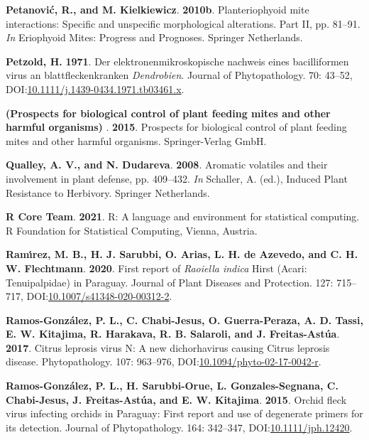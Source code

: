 \documentclass[12pt,final,CPage]{ufthesis}
\newlength{\cslhangindent}
\newenvironment{CSLReferences}[2] %
{%
	\setlength{\parindent}{0pt}
	\ifodd #1 \everypar{\setlength{\hangindent}{\cslhangindent}}\ignorespaces\fi
	\ifnum #2 > 0
	\setlength{\parskip}{#2\baselineskip}
	\fi
}%
{}
\begin{document}
{\begin{CSLReferences}{1}{0}
  \leavevmode{}%
  \textbf{Petanović, R., and M. Kielkiewicz}. \textbf{2010b}. Plant{\textendash}eriophyoid mite interactions: Specific and unspecific morphological alterations. Part {II}, pp. 81--91. \emph{In} Eriophyoid Mites: Progress and Prognoses. Springer Netherlands.

  \leavevmode{}%
  \textbf{Petzold, H.} \textbf{1971}. Der elektronenmikroskopische nachweis eines bacilliformen virus an blattfleckenkranken {\emph{Dendrobien}}. Journal of Phytopathology. 70: 43--52, DOI:\href{https://doi.org/10.1111/j.1439-0434.1971.tb03461.x}{10.1111/j.1439-0434.1971.tb03461.x}.

  \leavevmode{}%
  \textbf{(Prospects for biological control of plant feeding mites and other harmful organisms) }. \textbf{2015}. Prospects for biological control of plant feeding mites and other harmful organisms. Springer-Verlag GmbH.

  \leavevmode{}%
  \textbf{Qualley, A. V., and N. Dudareva}. \textbf{2008}. Aromatic volatiles and their involvement in plant defense, pp. 409--432. \emph{In} Schaller, A. (ed.), Induced Plant Resistance to Herbivory. Springer Netherlands.

  \leavevmode{}%
  \textbf{R Core Team}. \textbf{2021}. R: A language and environment for statistical computing. R Foundation for Statistical Computing, Vienna, Austria.

  \leavevmode{}%
  \textbf{Ramı́rez, M. B., H. J. Sarubbi, O. Arias, L. H. de Azevedo, and C. H. W. Flechtmann}. \textbf{2020}. First report of {\emph{Raoiella indica}} {Hirst} ({Acari}: {Tenuipalpidae}) in {Paraguay}. Journal of Plant Diseases and Protection. 127: 715--717, DOI:\href{https://doi.org/10.1007/s41348-020-00312-2}{10.1007/s41348-020-00312-2}.

  \leavevmode{}%
  \textbf{Ramos-González, P. L., C. Chabi-Jesus, O. Guerra-Peraza, A. D. Tassi, E. W. Kitajima, R. Harakava, R. B. Salaroli, and J. Freitas-Astúa}. \textbf{2017}. {Citrus leprosis virus} {N}: A new dichorhavirus causing {Citrus leprosis} disease. Phytopathology{\textregistered}. 107: 963--976, DOI:\href{https://doi.org/10.1094/phyto-02-17-0042-r}{10.1094/phyto-02-17-0042-r}.

  \leavevmode{}%
  \textbf{Ramos-González, P. L., H. Sarubbi-Orue, L. Gonzales-Segnana, C. Chabi-Jesus, J. Freitas-Astúa, and E. W. Kitajima}. \textbf{2015}. {Orchid fleck virus} infecting orchids in {Paraguay}: First report and use of degenerate primers for its detection. Journal of Phytopathology. 164: 342--347, DOI:\href{https://doi.org/10.1111/jph.12420}{10.1111/jph.12420}.


\end{CSLReferences}}
\end{document}
